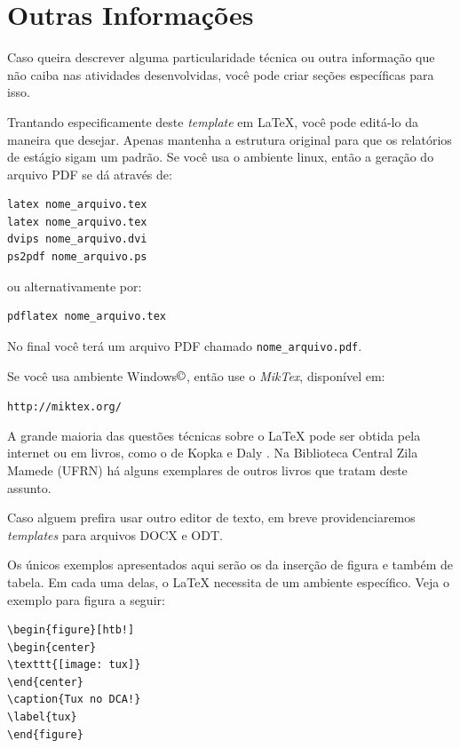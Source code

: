 \documentclass[a4paper, 12pt]{article}
\begin{document}

\section{Outras Informações}

Caso queira descrever alguma particularidade técnica ou outra informação que não caiba nas atividades desenvolvidas, você pode criar seções específicas para isso.

Trantando especificamente deste \emph{template} em {\LaTeX}, você pode editá-lo da maneira que desejar. Apenas mantenha a estrutura original para que os relatórios de estágio sigam um padrão. Se você usa o ambiente linux, então a geração do arquivo PDF se dá através de:

\begin{verbatim}
latex nome_arquivo.tex
latex nome_arquivo.tex
dvips nome_arquivo.dvi
ps2pdf nome_arquivo.ps
\end{verbatim}
ou alternativamente por:
\begin{verbatim}
pdflatex nome_arquivo.tex
\end{verbatim}

No final você terá um arquivo PDF chamado \verb+nome_arquivo.pdf+.

Se você usa ambiente Windows$\copyright$, então use o \emph{MikTex}, disponível em:
\begin{center}
\texttt{http://miktex.org/}
\end{center}

A grande maioria das questões técnicas sobre o {\LaTeX} pode ser obtida pela internet ou em livros, como o de Kopka e Daly 
\cite{livtex}. Na Biblioteca Central Zila Mamede (UFRN) há alguns exemplares de outros livros que tratam deste assunto.

Caso alguem prefira usar outro editor de texto, em breve providenciaremos \emph{templates} para arquivos DOCX e ODT.

Os únicos exemplos apresentados aqui serão os da inserção de figura e também de tabela. Em cada uma delas, o {\LaTeX} necessita de um ambiente específico. Veja o exemplo para figura a seguir:

\begin{verbatim}
\begin{figure}[htb!]
\begin{center}
\texttt{[image: tux]}
\end{center}
\caption{Tux no DCA!}
\label{tux}
\end{figure}
\end{verbatim}
\end{document}
